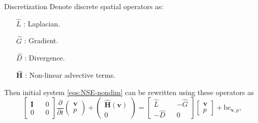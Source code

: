 \documentclass{beamer}
\begin{document}
	\begin{frame}{Discretization}
	Denote discrete spatial operators as:
\begin{enumerate}
	\item[$\hat{L}$]:  Laplacian.
	\item[$\hat{G}$]: Gradient.
	\item[$\hat{D}$]: Divergence.
	\item[$\mathbf{\hat{H}}$]: Non-linear advective terms.
\end{enumerate}
Then initial system \eqref{eqs:NSE-nondim} can be rewritten using these operators as
\begin{equation}\label{eqn:nse-matrix}
            \begin{bmatrix}
                  \mathbf{I} && 0 \\ 
                  0 && 0
            \end{bmatrix}
            \frac{\partial }{\partial t} 
            \begin{pmatrix}
                  \boldsymbol{v} \\ 
                  p
            \end{pmatrix}
            +
            \begin{pmatrix}
                  \mathbf{\hat{H}}(\boldsymbol{v})\\
                  0
            \end{pmatrix}
            =
            \begin{bmatrix}
                  \hat{L} && - \hat{G} \\ 
                  -\hat{D} && 0
            \end{bmatrix}
            \begin{bmatrix}
                  \boldsymbol{v} \\
                  p
            \end{bmatrix}
             + \text{bc}_{\boldsymbol{v},p},
        \end{equation}	
	\end{frame}
	
\end{document}
